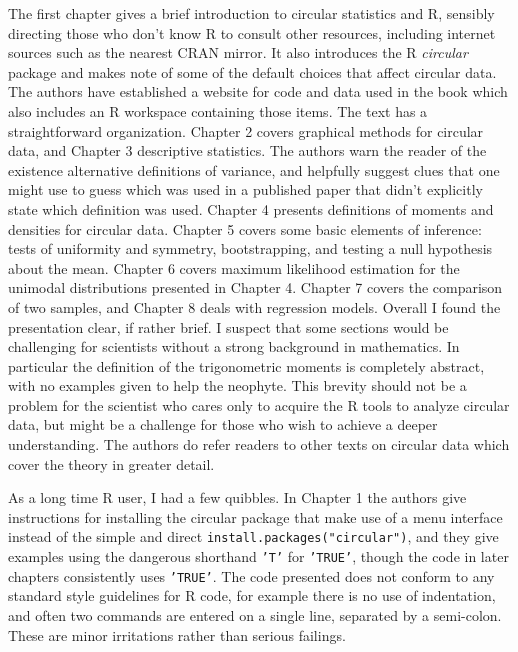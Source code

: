 \documentclass[12pt]{article}
\begin{document}
The first chapter gives a brief introduction to circular statistics
and R, sensibly directing those who don't know R to consult other
resources, including internet sources such as the nearest CRAN mirror.
It also introduces the R {\em circular} package and makes note of some
of the default choices that affect circular data.  The authors have
established a website for code and data used in the book which also
includes an R workspace containing those items.  The text has a
straightforward organization.  Chapter 2 covers graphical methods for
circular data, and Chapter 3 descriptive statistics.  The authors warn
the reader of the existence alternative definitions of variance, and
helpfully suggest clues that one might use to guess which was used in
a published paper that didn't explicitly state which definition was
used.  Chapter 4 presents definitions of moments and densities for
circular data.  Chapter 5 covers some basic elements of inference:
tests of uniformity and symmetry, bootstrapping, and testing a null
hypothesis about the mean.  Chapter 6 covers maximum likelihood
estimation for the unimodal distributions presented in Chapter 4.
Chapter 7 covers the comparison of two samples, and Chapter 8 deals
with regression models.  Overall I found the presentation clear, if
rather brief.  I suspect that some sections would be challenging for
scientists without a strong background in mathematics.  In particular
the definition of the trigonometric moments is completely abstract,
with no examples given to help the neophyte.  This brevity should not
be a problem for the scientist who cares only to acquire the R tools
to analyze circular data, but might be a challenge for those who wish
to achieve a deeper understanding.  The authors do refer readers to
other texts on circular data which cover the theory in greater detail.

As a long time R user, I had a few quibbles.  In Chapter 1 the authors
give instructions for installing the circular package that make use of
a menu interface instead of the simple and direct
{\tt install.packages("circular")}, and they give examples using the
dangerous shorthand {\tt 'T'} for {\tt 'TRUE'}, though the code in later chapters
consistently uses {\tt 'TRUE'}.  The code presented does not conform to any
standard style guidelines for R code, for example there is no use of
indentation, and often two commands are entered on a single line,
separated by a semi-colon.  These are minor irritations rather than
serious failings.
\end{document}
